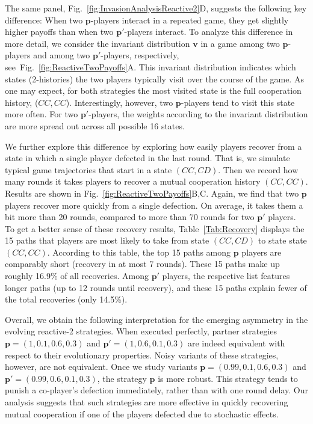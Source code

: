 \documentclass[9pt,twoside,lineno]{pnas-new}
\theoremstyle{plainCl1}
\theoremstyle{plainCl2}
\begin{document}
The same panel, Fig.~\ref{fig:InvasionAnalysisReactive2}D, suggests the following key difference:
When two $\mathbf{p}$-players interact in a repeated game, they get slightly higher payoffs than when two $\mathbf{p'}$-players interact. 
To analyze this difference in more detail, we consider the invariant distribution $\mathbf{v}$ in a game among two $\mathbf{p}$-players and among two $\mathbf{p'}$-players, respectively, see~Fig.~\ref{fig:ReactiveTwoPayoffs}A. 
This invariant distribution indicates which states (2-histories) the two players typically visit over the course of the game. 
As one may expect, for both strategies the most visited state is the full cooperation history, ($CC,CC$). 
Interestingly, however, two $\mathbf{p}$-players tend to visit this state more often. 
For two $\mathbf{p'}$-players, the weights according to the invariant distribution are more spread out across all possible 16 states. 

We further explore this difference by exploring how easily players recover from a state in which a single player defected in the last round. 
That is, we simulate typical game trajectories that start in a state $(CC,CD)$. 
Then we record how many rounds it takes players to recover a mutual cooperation history $(CC,CC)$. 
Results are shown in Fig.~\ref{fig:ReactiveTwoPayoffs}B,C.
Again, we find that two $\mathbf{p}$ players recover more quickly from a single defection. 
On average, it takes them a bit more than 20 rounds, compared to more than 70 rounds for two $\mathbf{p'}$ players. 
To get a better sense of these recovery results, Table~\ref{Tab:Recovery} displays the 15 paths that players are most likely to take from state $(CC,CD)$ to state state $(CC,CC)$. 
According to this table, the top 15 paths among $\mathbf{p}$ players are comparably short (recovery in at most 7 rounds). 
These 15 paths make up roughly 16.9\% of all recoveries. 
Among $\mathbf{p'}$ players, the respective list features longer paths (up to 12 rounds until recovery), and these 15 paths explain fewer of the total recoveries (only 14.5\%). 

Overall, we obtain the following interpretation for the emerging asymmetry in the evolving reactive-2 strategies. 
When executed perfectly, partner strategies  $\mathbf{p}\!=\!(1,0.1,0.6,0.3)$ and $\mathbf{p'}\!=\!(1,0.6,0.1,0.3)$ are indeed equivalent with respect to their evolutionary properties. 
Noisy variants of these strategies, however, are not equivalent. 
Once we study variants $\mathbf{p}\!=\!(0.99,0.1,0.6,0.3)$ and $\mathbf{p'}\!=\!(0.99,0.6,0.1,0.3)$, the strategy $\mathbf{p}$ is more robust. 
This strategy tends to punish a co-player's defection immediately, rather than with one round delay. 
Our analysis suggests that such strategies are more effective in quickly recovering mutual cooperation if one of the players defected due to stochastic effects.  
\end{document}
